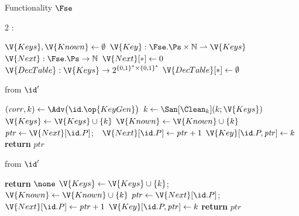 \begin{interface}[nofloat]{Functionality $\Fse$ \\
}

{\scriptsize
\setlength{\columnsep}{1.4em}
\begin{multicols}{2}
:
\begin{algorithmic}[1]
\setcounter{contline}{0}\algcont
\State $\V{Keys}, \V{Known} \gets \emptyset$
\State $\V{Key} : \Fse.\Ps \times \mathbb{N} \rightharpoonup \V{Keys}$
\State $\V{Next} : \Fse.\Ps \to \mathbb{N}$
\State $\V{Next}[*] \gets 0$
\State $\V{DecTable} : \V{Keys} \to 2^{\{0,1\}^{*} \times \{0,1\}^{*}}$
\State $\V{DecTable}[*] \gets \emptyset$
\algsave
\end{algorithmic}
\vspace{1.4ex}

 \quad from $\id'$
\begin{algorithmic}[1]
\algcont
\State $(\mathit{corr}, k) \gets \Adv\bigl(\id.\op{KeyGen}\bigr)$
\State $k \gets \San[\Clean_{k}](k; \V{Keys})$
\State $\V{Keys} \gets \V{Keys} \cup \{k\}$
  \State $\V{Known} \gets \V{Known} \cup \{k\}$
\EndIf
\State $\mathit{ptr} \gets \V{Next}[\id.P]$;\ \ $\V{Next}[\id.P] \gets \mathit{ptr} + 1$
\State $\V{Key}[\id.P, \mathit{ptr}] \gets k$
\State \textbf{return} $\mathit{ptr}$
\algsave
\end{algorithmic}
\vspace{1.4ex}

 \quad from $\id'$
\begin{algorithmic}[1]
\algcont
{}
  \State \textbf{return} $\none$
\EndIf
\State $\V{Keys} \gets \V{Keys} \cup \{k\}$;\ \ $\V{Known} \gets \V{Known} \cup \{k\}$
\State $\mathit{ptr} \gets \V{Next}[\id.P]$;\ \ $\V{Next}[\id.P] \gets \mathit{ptr} + 1$
\State $\V{Key}[\id.P, \mathit{ptr}] \gets k$
\State \textbf{return} $\mathit{ptr}$
\algsave
\end{algorithmic}
\vspace{1.4ex}

\columnbreak


\end{multicols}}
\end{interface}
